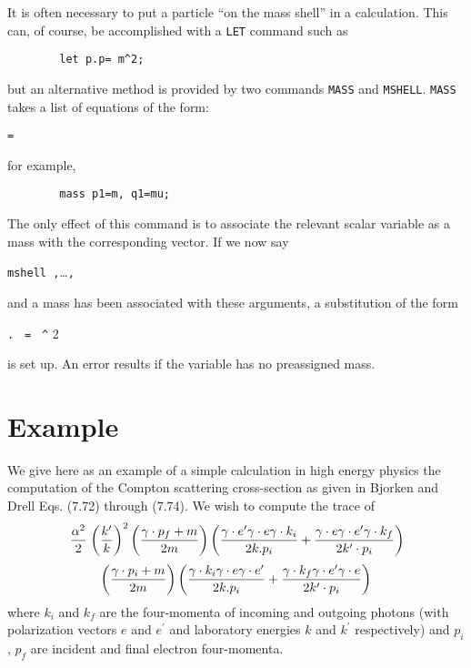 It is often necessary to put a particle ``on the mass shell'' in a
calculation.  This can, of course, be accomplished with a \texttt{LET}
command such as
\begin{verbatim}
        let p.p= m^2;
\end{verbatim}
but an alternative method is provided by two commands \texttt{MASS} and
\texttt{MSHELL}.
\texttt{MASS} takes a list of equations of the form:
\begin{syntax}
     \texttt{=} 
\end{syntax}
for example,
\begin{verbatim}
        mass p1=m, q1=mu;
\end{verbatim}
The only effect of this command is to associate the relevant scalar
variable as a mass with the corresponding vector. If we now say
\begin{syntax}
   \texttt{mshell }\texttt{,}\dots\texttt{,}
\end{syntax}
and a mass has been associated with these arguments, a substitution of the
form
\begin{syntax}
    \texttt{.} \texttt{ = }
       \texttt{\textasciicircum} 2
\end{syntax}
is set up. An error results if the variable has no preassigned mass.

\section{Example}

We give here as an example of a simple calculation in high energy physics
the computation of the Compton scattering cross-section as given in
Bjorken and Drell Eqs. (7.72) through (7.74). We wish to compute the trace of
\begin{displaymath}
\left. \alpha^2\over2 \right. \left({k^\prime\over k}\right)^2
 \left({\gamma\cdot p_f+m\over2m}\right)\left({\gamma\cdot e^\prime \gamma\cdot e
 \gamma\cdot k_i\over2k.p_i} + {\gamma\cdot e\gamma\cdot e^\prime
 \gamma\cdot k_f\over2k^\prime\cdot p_i}\right)
\end{displaymath}
\begin{displaymath}
 \left({\gamma\cdot p_i+m\over2m}\right)
 \left({\gamma\cdot k_i\gamma\cdot e\gamma\cdot e^\prime\over2k.p_i} +
 {\gamma\cdot k_f\gamma\cdot e^\prime\gamma\cdot e\over2k^\prime\cdot p_i}
 \right)
\end{displaymath}
where $k_i$ and $k_f$ are the four-momenta of incoming and outgoing photons
(with polarization vectors $e$ and $e^\prime$ and laboratory energies 
$k$ and $k^\prime$
respectively) and $p_i$, $p_f$ are incident and final electron four-momenta.

